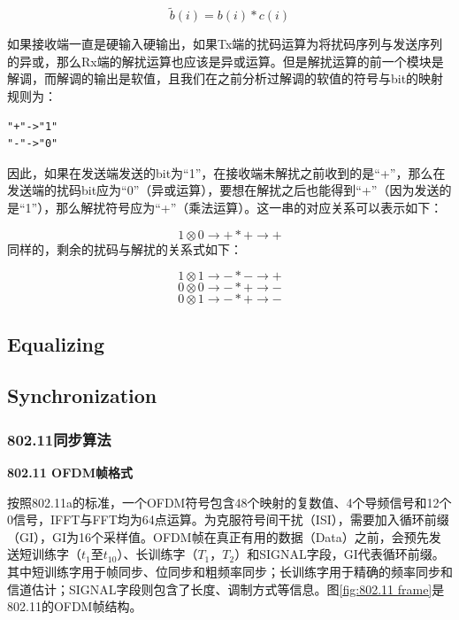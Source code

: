 \documentclass[titlepage]{article}
\numberwithin{figure}{section}
\numberwithin{equation}{section}
\begin{document}
\begin{displaymath}
  {\tilde b(i)}=b(i)*c(i)
\end{displaymath}

如果接收端一直是硬输入硬输出，如果Tx端的扰码运算为将扰码序列与发送序列的异或，那么Rx端的解扰运算也应该是异或运算。但是解扰运算的前一个模块是解调，而解调的输出是软值，且我们在之前分析过解调的软值的符号与bit的映射规则为：

\begin{verbatim}
"+"->"1"
"-"->"0"
\end{verbatim}

因此，如果在发送端发送的bit为“1”，在接收端未解扰之前收到的是“+”，那么在发送端的扰码bit应为“0”（异或运算），要想在解扰之后也能得到“+”（因为发送的是“1”），那么解扰符号应为“+”（乘法运算）。这一串的对应关系可以表示如下：

\begin{displaymath}
1 \otimes 0 \to + * + \to +
\end{displaymath}
同样的，剩余的扰码与解扰的关系式如下：

\begin{displaymath}
1 \otimes 1 \to - * - \to +
\end{displaymath}
\begin{displaymath}
0 \otimes 0 \to - * + \to -
\end{displaymath}
\begin{displaymath}
0 \otimes 1 \to - * + \to - 
\end{displaymath}

\subsection{Equalizing}

\subsection{Synchronization}

\subsubsection{802.11同步算法}

\textbf{802.11 OFDM帧格式}

按照802.11a的标准，一个OFDM符号包含48个映射的复数值、4个导频信号和12个0信号，IFFT与FFT均为64点运算。为克服符号间干扰（ISI），需要加入循环前缀（GI），GI为16个采样值。OFDM帧在真正有用的数据（Data）之前，会预先发送短训练字（$t_{1}$至$t_{10}$）、长训练字（$T_{1}$，$T_{2}$）和SIGNAL字段，GI代表循环前缀。其中短训练字用于帧同步、位同步和粗频率同步；长训练字用于精确的频率同步和信道估计；SIGNAL字段则包含了长度、调制方式等信息。图\ref{fig:802.11 frame}是802.11的OFDM帧结构。
\end{document}
